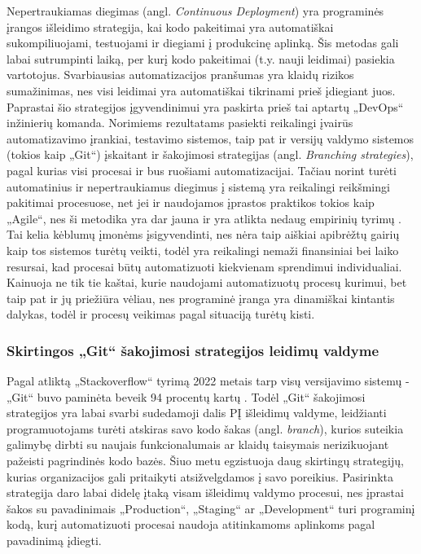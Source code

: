 \documentclass{VUMIFPSkursinis}
\begin{document}
Nepertraukiamas diegimas (angl. \textit{Continuous Deployment}) yra programinės įrangos išleidimo strategija, kai kodo pakeitimai yra automatiškai sukompiliuojami, testuojami ir diegiami į produkcinę aplinką. Šis metodas gali labai sutrumpinti laiką, per kurį kodo pakeitimai (t.y. nauji leidimai) pasiekia vartotojus. Svarbiausias automatizacijos pranšumas yra klaidų rizikos sumažinimas, nes visi leidimai yra automatiškai tikrinami prieš įdiegiant juos. Paprastai šio strategijos įgyvendinimui yra paskirta prieš tai aptartų „DevOps“ inžinierių komanda. Norimiems rezultatams pasiekti reikalingi įvairūs automatizavimo įrankiai, testavimo sistemos, taip pat ir versijų valdymo sistemos (tokios kaip „Git“) įskaitant ir šakojimosi strategijas (angl. \textit{Branching strategies}), pagal kurias visi procesai ir bus ruošiami automatizacijai. Tačiau norint turėti automatinius ir nepertraukiamus diegimus į sistemą yra reikalingi reikšmingi pakitimai procesuose, net jei ir naudojamos įprastos praktikos tokios kaip „Agile“, nes ši metodika yra dar jauna ir yra atlikta nedaug empirinių tyrimų \cite{SaltSeptintas}. Tai kelia kėblumų įmonėms įsigyvendinti, nes nėra taip aiškiai apibrėžtų gairių kaip tos sistemos turėtų veikti, todėl yra reikalingi nemaži finansiniai bei laiko resursai, kad procesai būtų automatizuoti kiekvienam sprendimui individualiai. Kainuoja ne tik tie kaštai, kurie naudojami automatizuotų procesų kurimui, bet taip pat ir jų priežiūra vėliau, nes programinė įranga yra dinamiškai kintantis dalykas, todėl ir procesų veikimas pagal situaciją turėtų kisti.
    
    \subsubsection{Skirtingos „Git“ šakojimosi strategijos leidimų valdyme}

Pagal atliktą „Stackoverflow“ tyrimą 2022 metais tarp visų versijavimo sistemų - „Git“ buvo paminėta beveik 94 procentų kartų \cite{SaltAstuntas}. Todėl „Git“ šakojimosi strategijos yra labai svarbi sudedamoji dalis PĮ išleidimų valdyme, leidžianti programuotojams turėti atskiras savo kodo šakas (angl. \textit{branch}), kurios suteikia galimybę dirbti su naujais funkcionalumais ar klaidų taisymais nerizikuojant pažeisti pagrindinės kodo bazės. Šiuo metu egzistuoja daug skirtingų strategijų, kurias organizacijos gali pritaikyti atsižvelgdamos į savo poreikius. Pasirinkta strategija daro labai didelę įtaką visam išleidimų valdymo procesui, nes įprastai šakos su pavadinimais „Production“, „Staging“ ar „Development“ turi programinį kodą, kurį automatizuoti procesai naudoja atitinkamoms aplinkoms pagal pavadinimą įdiegti.
\end{document}
